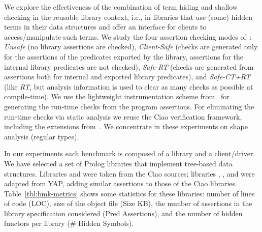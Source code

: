 \documentclass{llncs}
\begin{document}
We
explore the effectiveness of the combination of term hiding and
shallow checking in the reusable library context, i.e., in libraries that
use (some) hidden terms in their data structures and offer an
interface for clients to access/manipulate such terms.
%
We study
the four assertion checking modes of~\cite{optchk-ppdp2016-shorter}:
%
\emph{Unsafe} (no library assertions are checked),
%
\emph{Client-Safe} (checks are generated only for the assertions
of the predicates exported by the library, assertions for the internal
library predicates are not checked),
%
\emph{Safe-RT} (checks are generated from assertions both for internal
 and exported library predicates),
%
and \emph{Safe-CT+RT} (like \emph{RT}, but analysis information is used
to clear as many checks as possible at compile-time).
%
We use the lightweight instrumentation scheme
from~\cite{cached-rtchecks-iclp2015-shorter} for generating the run-time checks
from the program assertions.
%
For eliminating the run-time checks via static analysis
we reuse the Ciao verification framework, including the extensions
from~\cite{optchk-ppdp2016-shorter}.
%
We concentrate in
these experiments on shape analysis (regular types).



In our experiments each benchmark is composed of a library and a
client/driver.
%
We have selected a set of Prolog libraries that implement tree-based
data structures.
%
Libraries  and
  were taken from the Ciao
sources; libraries , , and  were
adapted from
YAP,
adding similar assertions to those of the Ciao libraries.
%
Table~\ref{tbl:bmk-metrics} shows some statistics for these libraries:
number of lines of code (LOC), size of the object file (Size KB),
the number of assertions in the library specification considered
(Pred Assertions), and the number of hidden functors per library
($\#$ Hidden Symbols).
\end{document}
